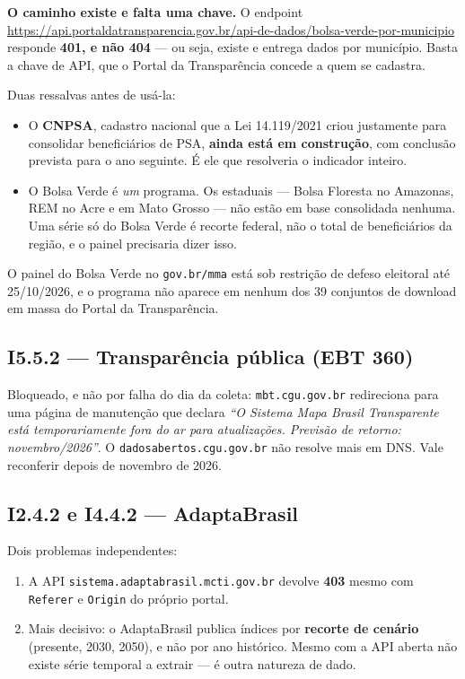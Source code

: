 \documentclass[11pt,a4paper]{article}
\begin{document}
\textbf{O caminho existe e falta uma chave.} O endpoint
\url{https://api.portaldatransparencia.gov.br/api-de-dados/bolsa-verde-por-municipio}
responde \textbf{401, e não 404} --- ou seja, existe e entrega dados por município.
Basta a chave de API, que o Portal da Transparência concede a quem se cadastra.

Duas ressalvas antes de usá-la:

\begin{itemize}
  \item O \textbf{CNPSA}, cadastro nacional que a Lei 14.119/2021 criou justamente para
    consolidar beneficiários de PSA, \textbf{ainda está em construção}, com conclusão
    prevista para o ano seguinte. É ele que resolveria o indicador inteiro.
  \item O Bolsa Verde é \emph{um} programa. Os estaduais --- Bolsa Floresta no Amazonas,
    REM no Acre e em Mato Grosso --- não estão em base consolidada nenhuma. Uma série só
    do Bolsa Verde é recorte federal, não o total de beneficiários da região, e o painel
    precisaria dizer isso.
\end{itemize}

O painel do Bolsa Verde no \texttt{gov.br/mma} está sob restrição de defeso eleitoral
até 25/10/2026, e o programa não aparece em nenhum dos 39 conjuntos de download em
massa do Portal da Transparência.

\subsection*{I5.5.2 --- Transparência pública (EBT 360)}

Bloqueado, e não por falha do dia da coleta: \texttt{mbt.cgu.gov.br} redireciona para
uma página de manutenção que declara \emph{``O Sistema Mapa Brasil Transparente está
temporariamente fora do ar para atualizações. Previsão de retorno: novembro/2026''}. O
\texttt{dadosabertos.cgu.gov.br} não resolve mais em DNS. Vale reconferir depois de
novembro de 2026.

\subsection*{I2.4.2 e I4.4.2 --- AdaptaBrasil}

Dois problemas independentes:

\begin{enumerate}
  \item A API \texttt{sistema.adaptabrasil.mcti.gov.br} devolve \textbf{403} mesmo com
    \texttt{Referer} e \texttt{Origin} do próprio portal.
  \item Mais decisivo: o AdaptaBrasil publica índices por \textbf{recorte de cenário}
    (presente, 2030, 2050), e não por ano histórico. Mesmo com a API aberta não existe
    série temporal a extrair --- é outra natureza de dado.
\end{enumerate}
\end{document}
